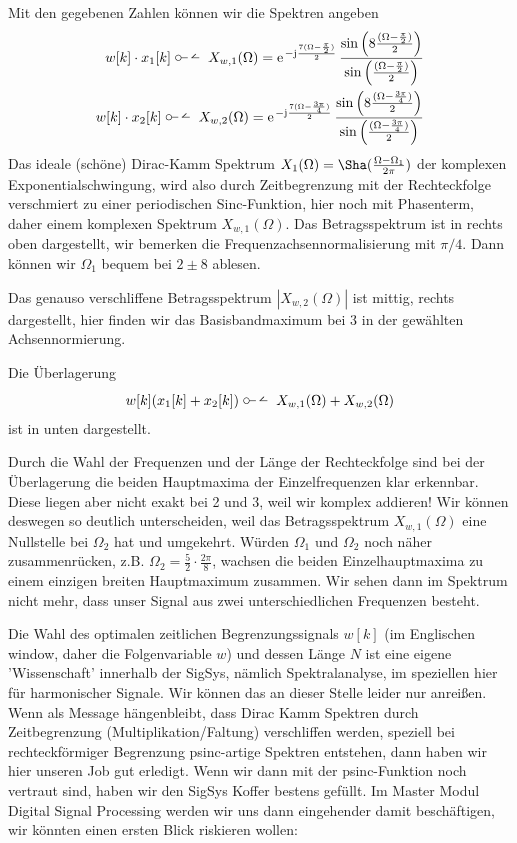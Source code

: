 %
\begin{Loesung}
Mit den gegebenen Zahlen können wir die Spektren angeben
\begin{align}
w[k] \cdot x_1[k]\dtft
X_{w,1}(\Omega) = \e^{-\im\frac{7(\Omega-\frac{\pi}{2})}{2}}\,
\frac{\sin\left(8\frac{(\Omega-\frac{\pi}{2})}{2}\right)}{\sin\left(\frac{(\Omega-\frac{\pi}{2})}{2}\right)}
%
\\
w[k] \cdot x_2[k]\dtft
X_{w,2}(\Omega) = \e^{-\im\frac{7(\Omega-\frac{3\pi}{4})}{2}}\,
\frac{\sin\left(8\frac{(\Omega-\frac{3\pi}{4})}{2}\right)}{\sin\left(\frac{(\Omega-\frac{3\pi}{4})}{2}\right)}
\end{align}
%
Das ideale (schöne) Dirac-Kamm Spektrum $X_1(\Omega)=\Sha(\frac{\Omega-\Omega_1}{2\pi})$
der komplexen Exponentialschwingung, wird also durch
Zeitbegrenzung mit der Rechteckfolge verschmiert zu einer periodischen Sinc-Funktion,
hier noch mit Phasenterm, daher einem komplexen Spektrum $X_{w,1}(\Omega)$.
%
Das Betragsspektrum ist in  rechts oben dargestellt,
wir bemerken die Frequenzachsennormalisierung mit $\pi/4$. Dann können wir
$\Omega_1$ bequem bei $2 \pm 8$ ablesen.

Das genauso verschliffene Betragsspektrum $|X_{w,2}(\Omega)|$ ist mittig, rechts
dargestellt, hier finden wir das Basisbandmaximum bei $3$ in der gewählten Achsennormierung.

Die Überlagerung
\begin{align}
w[k](x_1[k]+x_2[k]) \dtft   X_{w,1}(\Omega) + X_{w,2}(\Omega)
\end{align}
ist in  unten dargestellt.

Durch die Wahl der Frequenzen und der Länge der Rechteckfolge
sind bei der Überlagerung die beiden Hauptmaxima der Einzelfrequenzen klar erkennbar.
Diese liegen aber nicht exakt bei 2 und 3, weil wir komplex addieren! Wir können
deswegen so deutlich unterscheiden, weil das Betragsspektrum
$X_{w,1}(\Omega)$ eine Nullstelle bei $\Omega_2$ hat und umgekehrt.
Würden $\Omega_1$ und $\Omega_2$ noch näher zusammenrücken, z.B. $\Omega_2=\frac{5}{2}\cdot\frac{2\pi}{8}$,
wachsen die beiden Einzelhauptmaxima zu einem einzigen breiten Hauptmaximum zusammen.
Wir sehen dann im Spektrum nicht mehr, dass unser Signal aus zwei unterschiedlichen Frequenzen besteht.
%
\end{Loesung}

Die Wahl des optimalen zeitlichen Begrenzungssignals $w[k]$ (im Englischen window, daher
die Folgenvariable $w$) und dessen Länge $N$ ist eine eigene 'Wissenschaft' innerhalb
der SigSys, nämlich Spektralanalyse, im speziellen hier für harmonischer Signale.
Wir können das an dieser Stelle leider nur anreißen.
%
Wenn als Message hängenbleibt, dass Dirac Kamm Spektren durch Zeitbegrenzung (Multiplikation/Faltung)
verschliffen werden, speziell bei rechteckförmiger Begrenzung psinc-artige Spektren
entstehen, dann haben wir hier unseren Job gut erledigt.
%
Wenn wir dann mit der psinc-Funktion noch vertraut sind, haben wir den SigSys Koffer
bestens gefüllt.
%
Im Master Modul Digital Signal Processing werden wir uns dann eingehender damit
beschäftigen, wir könnten einen ersten Blick riskieren wollen:

